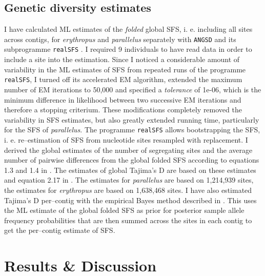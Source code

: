 \documentclass[a4paper,12pt,times,authoryear,twoside,print,index]{Classes/PhDThesisPSnPDF}\usepackage[]{graphicx}\usepackage[]{color}
\begin{document}
\subsection{Genetic diversity estimates}
%
%
I have calculated ML estimates of the \emph{folded} global \gls{SFS}, i. e. including all sites across contigs, for \textit{erythropus} and \textit{parallelus} separately with \texttt{ANGSD} and its subprogramme \texttt{realSFS} \citep{Korneliussen2014}. 
I required 9 individuals to have read data in order to include a site into the estimation. Since I noticed a considerable amount of variability in the ML estimates of SFS from repeated runs of the programme \texttt{realSFS}, I turned off its accelerated \gls{EM} algorithm, extended the maximum number of \gls{EM} iterations to 50,000 and specified a \textit{tolerance} of 1e-06, which is the minimum difference in likelihood between two successive \gls{EM} iterations and therefore a stopping criterium. These modifications completely removed the variability in SFS estimates, but also greatly extended running time, particularly for the \gls{SFS} of \textit{parallelus}. The programme \texttt{realSFS} allows bootstrapping the \gls{SFS}, i. e. re--estimation of \gls{SFS} from nucleotide sites resampled with replacement. I derived the global estimates of the number of segregating sites and the average number of pairwise differences from the global folded \gls{SFS} according to equations 1.3 and 1.4 in \cite{Wakeley2009}. The estimates of global Tajima's D are based on these estimates and equation 2.17 in \cite{Gillespie2004}. The estimates for \textit{parallelus} are based on 1,214,939 sites, the estimates for \textit{erythropus} are based on 1,638,468 sites. I have also estimated Tajima's D per--contig with the empirical Bayes method described in \cite{Korneliussen2014}. This uses the ML estimate of the global folded \gls{SFS} as prior for posterior sample allele frequency probabilities that are then summed across the sites in each contig to get the per--contig estimate of \gls{SFS}.

%
%
%
\section{Results \& Discussion}
%
%
%

%
%
\end{document}
